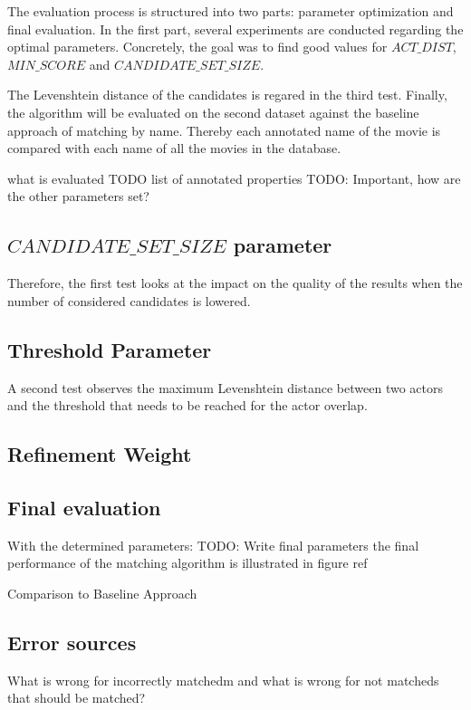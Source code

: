 The evaluation process is structured into two parts: parameter optimization and final evaluation.
In the first part, several experiments are conducted regarding the optimal parameters.
Concretely, the goal was to find good values for $ACT\_DIST$, $MIN\_SCORE$ and $CANDIDATE\_SET\_SIZE$.


The Levenshtein distance of the candidates is regared in the third test.
Finally, the algorithm will be evaluated on the second dataset against the baseline approach of matching by name.
Thereby each annotated name of the movie is compared with each name of all the movies in the database.

what is evaluated TODO
list of annotated properties
TODO: Important, how are the other parameters set?

\subsection{$CANDIDATE\_SET\_SIZE$ parameter}
Therefore, the first test looks at the impact on the quality of the results when the number of considered candidates is lowered.
\subsection{Threshold Parameter}

A second test observes the maximum Levenshtein distance between two actors and the threshold that needs to be reached for the actor overlap.
\subsection{Refinement Weight}

\subsection{Final evaluation}
With the determined parameters:
TODO: Write final parameters
the final performance of the matching algorithm is illustrated in figure ref

Comparison to Baseline Approach

\subsection{Error sources}
What is wrong for incorrectly matchedm
and what is wrong for not matcheds that should be matched?
